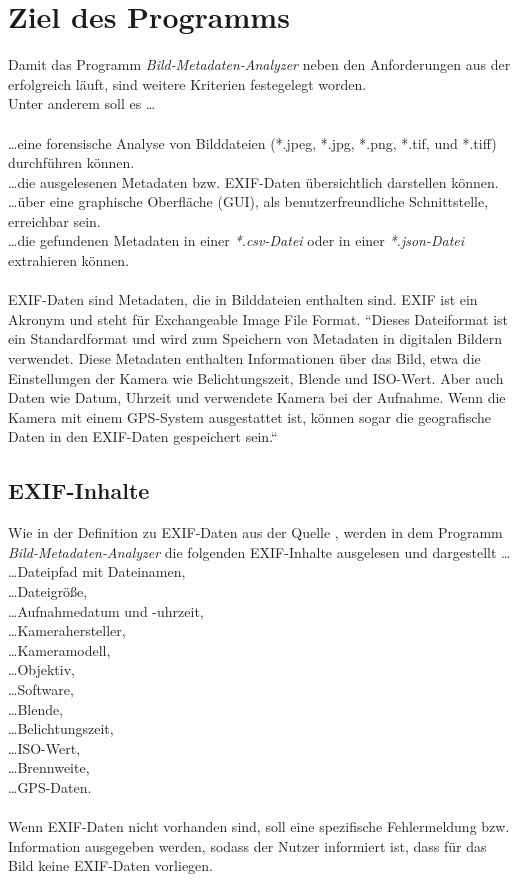 \documentclass{Bild-Metadaten-Analyzer}
\begin{document}
\section{Ziel des Programms}\label{sec:Ziel des Programms}
Damit das Programm \textit{Bild-Metadaten-Analyzer} neben den Anforderungen aus der  erfolgreich läuft,
sind weitere Kriterien festegelegt worden.
\\Unter anderem soll es \ldots\\
\\\ldots eine forensische Analyse von Bilddateien (*.jpeg, *.jpg, *.png, *.tif, und *.tiff) durchführen können.
\\\ldots die ausgelesenen Metadaten bzw. EXIF-Daten übersichtlich darstellen können.
\\\ldots über eine graphische Oberfläche (GUI), als benutzerfreundliche Schnittstelle, erreichbar sein.
\\\ldots die gefundenen Metadaten in einer \textit{*.csv-Datei} oder in einer \textit{*.json-Datei} extrahieren können.\\
\\EXIF-Daten sind Metadaten, die in Bilddateien enthalten sind. EXIF ist ein Akronym und steht für Exchangeable Image File Format.
``Dieses Dateiformat ist ein Standardformat und wird zum Speichern von Metadaten in digitalen Bildern verwendet. 
Diese Metadaten enthalten Informationen über das Bild, etwa die Einstellungen der Kamera wie Belichtungszeit, Blende und ISO-Wert. 
Aber auch Daten wie Datum, Uhrzeit und verwendete Kamera bei der Aufnahme. Wenn die Kamera mit einem GPS-System ausgestattet ist, 
können sogar die geografische Daten in den EXIF-Daten gespeichert sein.`` \cite{Onlinequelle:1}
\subsection{EXIF-Inhalte}\label{subsec:EXIF-Inhalte}
Wie in der Definition zu EXIF-Daten aus der Quelle \cite[E. M. Zylinski. „Was sind EXIF-Daten?“]{Onlinequelle:1}, werden in dem 
Programm \textit{Bild-Metadaten-Analyzer} die folgenden EXIF-Inhalte ausgelesen und dargestellt \ldots
\\\ldots Dateipfad mit Dateinamen,
\\\ldots Dateigröße,
\\\ldots Aufnahmedatum und -uhrzeit,
\\\ldots Kamerahersteller,
\\\ldots Kameramodell,
\\\ldots Objektiv,
\\\ldots Software,
\\\ldots Blende,
\\\ldots Belichtungszeit,
\\\ldots ISO-Wert,
\\\ldots Brennweite,
\\\ldots GPS-Daten.\\
\\Wenn EXIF-Daten nicht vorhanden sind, soll eine spezifische Fehlermeldung bzw. Information ausgegeben werden, sodass der Nutzer 
informiert ist, dass für das Bild keine EXIF-Daten vorliegen.
\end{document}

